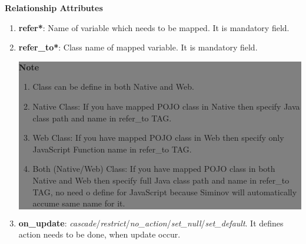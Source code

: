 \begin{enumerate}
			
		\textbf{Relationship Attributes}

		\begin{enumerate}

			\item \small \textbf{refer*}: Name of variable which needs to be mapped. It is mandatory field.

			\item \small \textbf{refer\_to*}: Class name of mapped variable. It is mandatory field.

			\begin{center}
				\colorbox{grey}{
					\parbox[t]{.8\linewidth}{
						\fontsize{11pt}{11pt}\selectfont %
						\vspace*{0.1cm} %
		
						\hfill \textbf{Note} \\
			
						\hfill 	
						\begin{enumerate}

							\item \small Class can be define in both Native and Web.

							\item \small Native Class: If you have mapped POJO class in Native then specify Java class path and name in refer\_to TAG.

							\item \small Web Class: If you have mapped POJO class in Web then specify only JavaScript Function name in refer\_to TAG.

							\item \small Both (Native/Web) Class: If you have mapped POJO class in both Native and Web then specify full Java class path and name in refer\_to TAG, no need o define for JavaScript because Siminov will automatically accume same name for it.	

						\end{enumerate}

						\vspace*{0.0cm} %
				}
			}

		\end{center}



			\item \small \textbf{on\_update}: \textit{cascade}/\textit{restrict}/\textit{no\_action}/\textit{set\_null}/\textit{set\_default}. It defines action needs to be done, when update occur.


\end{enumerate}
\end{enumerate}
